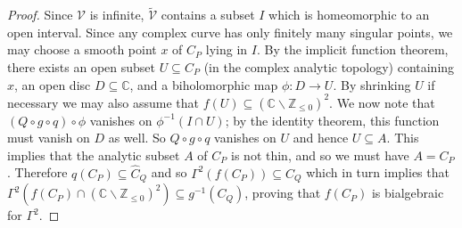 \documentclass[10pt,a4paper]{amsart}
\newcommand{\cV}{\mathcal{V}}
\renewcommand{\tilde}{\widetilde}
\begin{document}
\begin{proof}
 Since $\mathcal V$ is infinite, $\tilde{\cV}$ contains a subset $I$ which is homeomorphic to an open interval.  Since any complex curve has only finitely many singular points, we may choose a smooth point $x$ of $C_P$ lying in $I$.  By the implicit function theorem, there exists an open subset $U \subseteq C_P$ (in the complex analytic topology) containing $x$, an open disc $D \subseteq \mathbb C$,  and a biholomorphic map $\phi: D \rightarrow U$.  By shrinking $U$ if necessary we  may also assume that  $f(U) \subseteq (\mathbb C  \smallsetminus \mathbb Z_{\leq 0})^{2}$. We now note that $(Q \circ g \circ q) \circ \phi$ vanishes on $\phi^{-1}(I \cap U)$; by the identity theorem, this function must vanish on $D$ as well.  So $Q \circ g \circ q$ vanishes on $U$ and hence $U \subseteq A$. 
This implies that the analytic subset $A$ of $C_P$ is not thin,  
and so we must have $A=C_P$. Therefore $q(C_P)\subseteq \hat{C}_Q$ and so $\Gamma^2(f(C_P)) \subseteq \hat{C}_Q $ which in turn implies that $\Gamma^2(f(C_P) \cap (\mathbb C  \smallsetminus \mathbb Z_{\leq 0})^{2} ) \subseteq g^{-1}(C_Q)$, proving that  $f(C_P)$ is bialgebraic for $\Gamma^2$. 
\end{proof}
\end{document}
